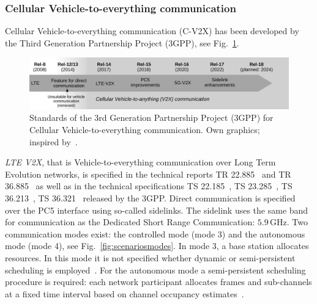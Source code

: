 \subsubsection{Cellular Vehicle-to-everything communication}
Cellular Vehicle-to-everything communication (C-V2X) has been developed by the Third Generation Partnership Project (3GPP), see Fig.~\ref{fig:overviewofreleases3gpp}. 


\begin{figure}[hbt!]
\includegraphics[width=\textwidth]{../figures/state-of-the-art/mobilecommunication/release3gpp.pdf} 
\caption{Standards of the 3rd Generation Partnership Project (3GPP) for Cellular Vehicle-to-everything communication. Own graphics; inspired by~\cite{bazzi-2021-com}.}
\label{fig:overviewofreleases3gpp}
\end{figure}


\textit{LTE V2X}, that is Vehicle-to-everything communication over Long Term Evolution networks, is specified in the technical reports TR 22.885~\cite{3gpp-22.885-2015-com} and TR 36.885~\cite{3gpp-36.885-2016-com} as well as in the technical specifications TS 22.185~\cite{3gpp-22.185-2020-com}, TS 23.285~\cite{3gpp-23.285-2020-com}, TS 36.213~\cite{3gpp-36.213-2020-com}, TS 36.321~\cite{3gpp-36.321-2020-com} released by the 3GPP. Direct communication is specified over the PC5 interface using so-called sidelinks. The sidelink uses the same band for communication as the Dedicated Short Range Communication: $5.9\,\text{GHz}$.
Two communication modes exist: the controlled mode (mode 3) and the autonomous mode (mode 4), see Fig.~\ref{fig:scenariosmodes}. In mode 3, a base station allocates resources. In this mode it is not specified whether dynamic or semi-persistent scheduling is employed~\cite{bazzi-2021-com}. 
For the autonomous mode a semi-persistent scheduling procedure is required: each network participant allocates frames and sub-channels at a fixed time interval based on channel occupancy estimates~\cite{bazzi-2021-com}. 




